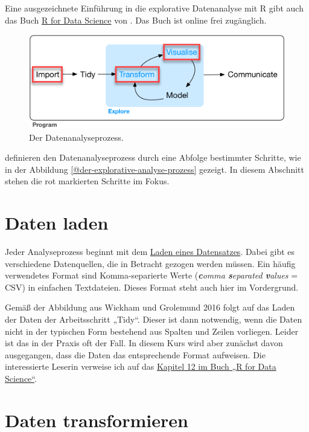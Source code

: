 \documentclass[
]{book}
\begin{document}
Eine ausgezeichnete Einführung in die explorative Datenanalyse mit R gibt auch das Buch \href{https://r4ds.had.co.nz}{R for Data Science} von \citet{wickham_r_2016}. Das Buch ist online frei zugänglich.

\begin{figure}
\includegraphics[width=0.5\linewidth]{fig/prozess_explorative_datenanalyse} \caption{Der Datenanalyseprozess.}\label{fig:der-explorative-analyse-prozess}
\end{figure}

\citet{wickham_r_2016} definieren den Datenanalyseprozess durch eine Abfolge bestimmter Schritte, wie in der Abbildung \ref{@der-explorative-analyse-prozess} gezeigt. In diesem Abschnitt stehen die rot markierten Schritte im Fokus.

\hypertarget{daten-laden}{%
\section{Daten laden}\label{daten-laden}}

Jeder Analyseprozess beginnt mit dem \href{}{Laden eines Datensatzes}. Dabei gibt es verschiedene Datenquellen, die in Betracht gezogen werden müssen. Ein häufig verwendetes Format sind Komma-separierte Werte (\emph{\textbf{c}omma \textbf{s}eparated \textbf{v}alues} = CSV) in einfachen Textdateien. Dieses Format steht auch hier im Vordergrund.

Gemäß der Abbildung aus Wickham und Grolemund 2016 folgt auf das Laden der Daten der Arbeitsschritt „Tidy``. Dieser ist dann notwendig, wenn die Daten nicht in der typischen Form bestehend aus Spalten und Zeilen vorliegen. Leider ist das in der Praxis oft der Fall. In diesem Kurs wird aber zunächst davon ausgegangen, dass die Daten das entsprechende Format aufweisen. Die interessierte Leserin verweise ich auf das \href{11-der-analyseprozess.md\#explorative-datenanalyse-mit-r}{Kapitel 12 im Buch „R for Data Science``}.

\hypertarget{daten-transformieren}{%
\section{Daten transformieren}\label{daten-transformieren}}
\end{document}

